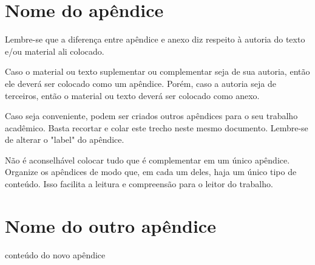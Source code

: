 % 
%


\begin{apendicesenv}
\partapendices

\chapter{Nome do apêndice} %
\label{chap:apendiceA}

Lembre-se que a diferença entre apêndice e anexo diz respeito à autoria do texto e/ou material ali colocado.

Caso o material ou texto suplementar ou complementar seja de sua autoria, então ele deverá ser colocado como um apêndice. Porém, caso a autoria seja de terceiros, então o material ou texto deverá ser colocado como anexo.

Caso seja conveniente, podem ser criados outros apêndices para o seu trabalho acadêmico. Basta recortar e colar este trecho neste mesmo documento. Lembre-se de alterar o "label"{} do apêndice.

Não é aconselhável colocar tudo que é complementar em um único apêndice. Organize os apêndices de modo que, em cada um deles, haja um único tipo de conteúdo. Isso facilita a leitura e compreensão para o leitor do trabalho.

\chapter{Nome do outro apêndice}
\label{chap:apendiceB}

conteúdo do novo apêndice

\end{apendicesenv}
